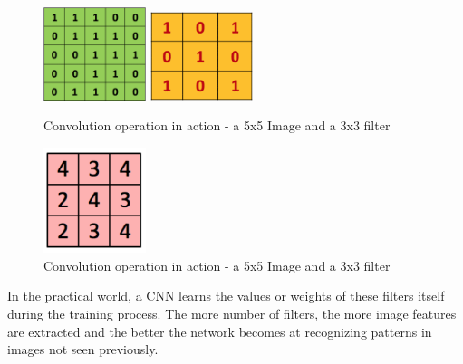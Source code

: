 \begin{figure}[h!]
\centering
\includegraphics[width=3cm]{figures/Image.png}
\hspace{4mm}
\includegraphics[width=3cm]{figures/Filter.png}
\caption{Convolution operation in action - a 5x5 Image  and a 3x3 filter}
\label{fig:cnn8}
\end{figure}

\begin{figure}[h!]
\centering
\includegraphics[width=3cm]{figures/Convolution_Result.png}
\caption{Convolution operation in action - a 5x5 Image  and a 3x3 filter}
\label{fig:cnn9}
\end{figure}

In the practical world, a CNN learns the values or weights of these filters itself during the training process. The more number of filters, the more image features are extracted and the better the network becomes at recognizing patterns in images not seen previously.


